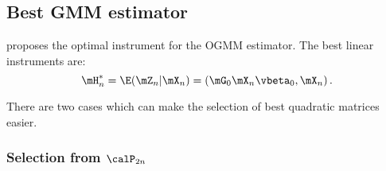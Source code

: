 \subsection{Best GMM estimator}

\cite{lee2007gmm} proposes the optimal instrument for the OGMM estimator. The best linear instruments are:
\begin{equation*}
  \mH_n^* = \E(\mZ_n|\mX_n) = \left(\mG_0\mX_n\vbeta_0, \mX_n\right).
\end{equation*}

There are two cases which can make the selection of best quadratic matrices easier.

\subsubsection{Selection from $\calP_{2n}$}

